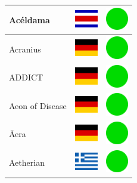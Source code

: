 \documentclass[12pt, a4paper, twoside]{report}
\begin{document}
\begin{center}
\begin{longtable}{|p{5cm}|p{2cm}|p{2cm}|}
Acéldama & \includegraphics[width=1cm]{4x3/cr} & \includegraphics[width=1cm]{likes/y} \\ \hline
Acranius & \includegraphics[width=1cm]{4x3/de} & \includegraphics[width=1cm]{likes/y} \\ \hline
ADDICT & \includegraphics[width=1cm]{4x3/de} & \includegraphics[width=1cm]{likes/y} \\ \hline
Aeon of Disease & \includegraphics[width=1cm]{4x3/de} & \includegraphics[width=1cm]{likes/y} \\ \hline
Äera & \includegraphics[width=1cm]{4x3/de} & \includegraphics[width=1cm]{likes/y} \\ \hline
Aetherian & \includegraphics[width=1cm]{4x3/gr} & \includegraphics[width=1cm]{likes/y} \\ \hline

\end{longtable}
\end{center}
\end{document}
